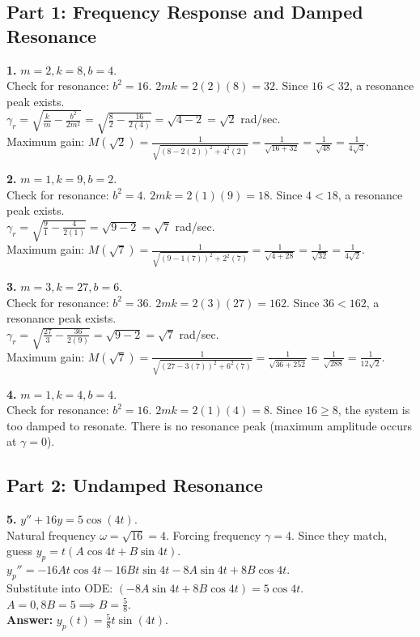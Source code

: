 \documentclass[11pt]{article}
\begin{document}
\subsection*{Part 1: Frequency Response and Damped Resonance}

\textbf{1.} $m = 2, k = 8, b = 4$. \\
Check for resonance: $b^2 = 16$. $2mk = 2(2)(8) = 32$. Since $16 < 32$, a resonance peak exists. \\
$\gamma_r = \sqrt{\frac{k}{m} - \frac{b^2}{2m^2}} = \sqrt{\frac{8}{2} - \frac{16}{2(4)}} = \sqrt{4 - 2} = \sqrt{2}$ rad/sec. \\
Maximum gain: $M(\sqrt{2}) = \frac{1}{\sqrt{(8 - 2(2))^2 + 4^2(2)}} = \frac{1}{\sqrt{16 + 32}} = \frac{1}{\sqrt{48}} = \frac{1}{4\sqrt{3}}$.

\vspace{0.5cm}
\textbf{2.} $m = 1, k = 9, b = 2$. \\
Check for resonance: $b^2 = 4$. $2mk = 2(1)(9) = 18$. Since $4 < 18$, a resonance peak exists. \\
$\gamma_r = \sqrt{\frac{9}{1} - \frac{4}{2(1)}} = \sqrt{9 - 2} = \sqrt{7}$ rad/sec. \\
Maximum gain: $M(\sqrt{7}) = \frac{1}{\sqrt{(9 - 1(7))^2 + 2^2(7)}} = \frac{1}{\sqrt{4 + 28}} = \frac{1}{\sqrt{32}} = \frac{1}{4\sqrt{2}}$.

\vspace{0.5cm}
\textbf{3.} $m = 3, k = 27, b = 6$. \\
Check for resonance: $b^2 = 36$. $2mk = 2(3)(27) = 162$. Since $36 < 162$, a resonance peak exists. \\
$\gamma_r = \sqrt{\frac{27}{3} - \frac{36}{2(9)}} = \sqrt{9 - 2} = \sqrt{7}$ rad/sec. \\
Maximum gain: $M(\sqrt{7}) = \frac{1}{\sqrt{(27 - 3(7))^2 + 6^2(7)}} = \frac{1}{\sqrt{36 + 252}} = \frac{1}{\sqrt{288}} = \frac{1}{12\sqrt{2}}$.

\vspace{0.5cm}
\textbf{4.} $m = 1, k = 4, b = 4$. \\
Check for resonance: $b^2 = 16$. $2mk = 2(1)(4) = 8$. Since $16 \ge 8$, the system is too damped to resonate. There is no resonance peak (maximum amplitude occurs at $\gamma = 0$).

\subsection*{Part 2: Undamped Resonance}

\textbf{5.} $y'' + 16y = 5 \cos(4t)$. \\
Natural frequency $\omega = \sqrt{16} = 4$. Forcing frequency $\gamma = 4$. Since they match, guess $y_p = t(A \cos 4t + B \sin 4t)$. \\
$y_p'' = -16A t \cos 4t - 16B t \sin 4t - 8A \sin 4t + 8B \cos 4t$. \\
Substitute into ODE: $(-8A \sin 4t + 8B \cos 4t) = 5 \cos 4t$. \\
$A = 0, 8B = 5 \implies B = \frac{5}{8}$. \\
\textbf{Answer:} $y_p(t) = \frac{5}{8} t \sin(4t)$.
\end{document}
